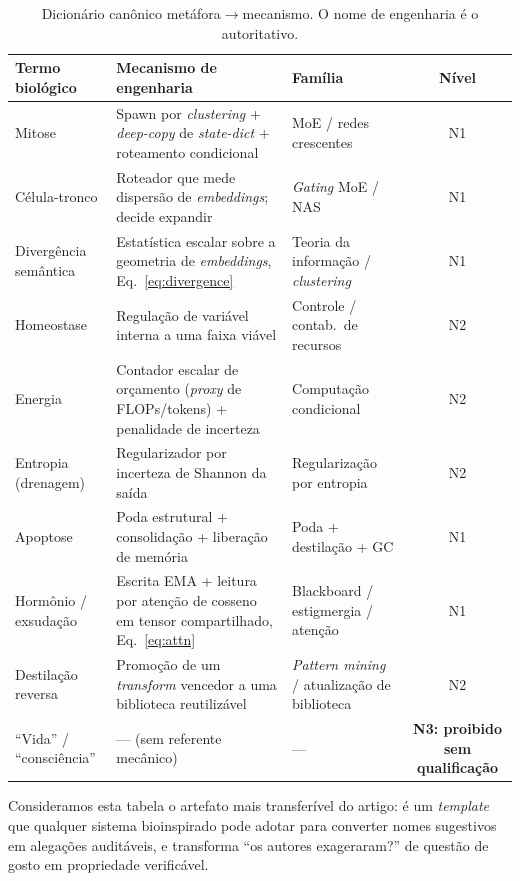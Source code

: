\documentclass[11pt]{article}
\begin{document}
\begin{table}[t]
\centering
\caption{Dicionário canônico metáfora$\rightarrow$mecanismo. O nome de engenharia
é o autoritativo.}
\label{tab:dict}
\small
\begin{tabular}{@{}p{2.7cm}p{6.4cm}p{3.0cm}c@{}}
\toprule
\textbf{Termo biológico} & \textbf{Mecanismo de engenharia} & \textbf{Família} & \textbf{Nível}\\
\midrule
Mitose & Spawn por \emph{clustering} + \emph{deep-copy} de \emph{state-dict} + roteamento condicional & MoE / redes crescentes & N1\\
Célula-tronco & Roteador que mede dispersão de \emph{embeddings}; decide expandir & \emph{Gating} MoE / NAS & N1\\
Divergência semântica & Estatística escalar sobre a geometria de \emph{embeddings}, Eq.~\eqref{eq:divergence} & Teoria da informação / \emph{clustering} & N1\\
Homeostase & Regulação de variável interna a uma faixa viável & Controle / contab.\ de recursos & N2\\
Energia & Contador escalar de orçamento (\emph{proxy} de FLOPs/tokens) + penalidade de incerteza & Computação condicional & N2\\
Entropia (drenagem) & Regularizador por incerteza de Shannon da saída & Regularização por entropia & N2\\
Apoptose & Poda estrutural + consolidação + liberação de memória & Poda + destilação + GC & N1\\
Hormônio / exsudação & Escrita EMA + leitura por atenção de cosseno em tensor compartilhado, Eq.~\eqref{eq:attn} & Blackboard / estigmergia / atenção & N1\\
Destilação reversa & Promoção de um \emph{transform} vencedor a uma biblioteca reutilizável & \emph{Pattern mining} / atualização de biblioteca & N2\\
``Vida'' / ``consciência'' & --- (sem referente mecânico) & --- & \textbf{N3: proibido sem qualificação}\\
\bottomrule
\end{tabular}
\end{table}

Consideramos esta tabela o artefato mais transferível do artigo: é um \emph{template}
que qualquer sistema bioinspirado pode adotar para converter nomes sugestivos em
alegações auditáveis, e transforma ``os autores exageraram?'' de questão de gosto
em propriedade verificável.

\end{document}
